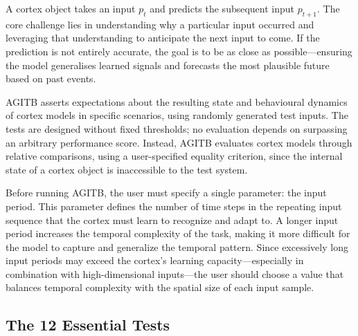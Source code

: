 \documentclass{article}
\begin{document}
A cortex object takes an input $p_t$ and predicts the subsequent input $p_{t+1}$. The core challenge lies in understanding why a particular input occurred and leveraging that understanding to anticipate the next input to come. If the prediction is not entirely accurate, the goal is to be as close as possible—ensuring the model generalises learned signals and forecasts the most plausible future based on past events.

AGITB asserts expectations about the resulting state and behavioural dynamics of cortex models in specific scenarios, using randomly generated test inputs. The tests are designed without fixed thresholds; no evaluation depends on surpassing an arbitrary performance score. Instead, AGITB evaluates cortex models through relative comparisons, using a user-specified equality criterion, since the internal state of a cortex object is inaccessible to the test system.

Before running AGITB, the user must specify a single parameter: the input period. This parameter defines the number of time steps in the repeating input sequence that the cortex must learn to recognize and adapt to. A longer input period increases the temporal complexity of the task, making it more difficult for the model to capture and generalize the temporal pattern. Since excessively long input periods may exceed the cortex’s learning capacity—especially in combination with high-dimensional inputs—the user should choose a value that balances temporal complexity with the spatial size of each input sample.

\subsection{The 12 Essential Tests}
\end{document}
